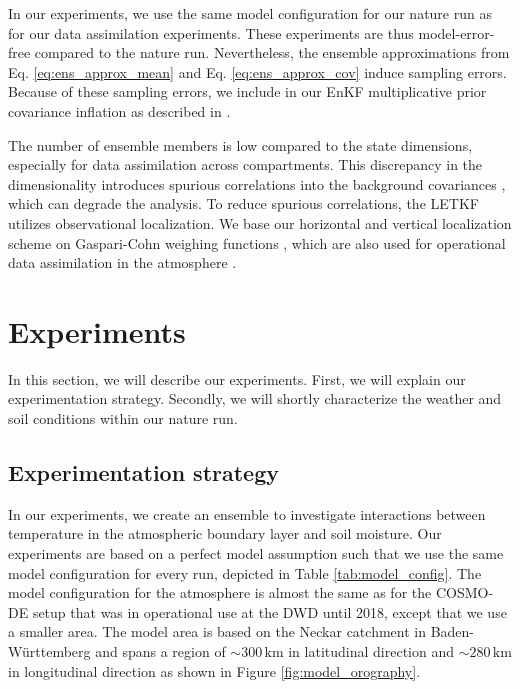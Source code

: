 \documentclass[hess, manuscript]{copernicus}
\begin{document}
In our experiments, we use the same model configuration for our nature run as for our data assimilation experiments.
These experiments are thus model-error-free compared to the nature run.
Nevertheless, the ensemble approximations from Eq. \eqref{eq:ens_approx_mean} and Eq. \eqref{eq:ens_approx_cov} induce sampling errors.
Because of these sampling errors, we include in our EnKF multiplicative prior covariance inflation as described in \citet{hunt_efficient_2007}.

The number of ensemble members is low compared to the state dimensions, especially for data assimilation across compartments.
This discrepancy in the dimensionality introduces spurious correlations into the background covariances \citep{miyoshi_10240-member_2014}, which can degrade the analysis.
To reduce spurious correlations, the LETKF utilizes observational localization.
We base our horizontal and vertical localization scheme on Gaspari-Cohn weighing functions \citep{gaspari_construction_1999}, which are also used for operational data assimilation in the atmosphere \citep{schraff_kilometre-scale_2016}.


\section{Experiments}

In this section, we will describe our experiments.
First, we will explain our experimentation strategy.
Secondly, we will shortly characterize the weather and soil conditions within our nature run.

\subsection{Experimentation strategy}

In our experiments, we create an ensemble to investigate interactions between temperature in the atmospheric boundary layer and soil moisture.
Our experiments are based on a perfect model assumption such that we use the same model configuration for every run, depicted in Table \ref{tab:model_config}.
The model configuration for the atmosphere is almost the same as for the COSMO-DE setup that was in operational use at the DWD until 2018, except that we use a smaller area.
The model area is based on the Neckar catchment in Baden-Württemberg and spans a region of $\sim 300\,\text{km}$ in latitudinal direction and $\sim 280\,\text{km}$ in longitudinal direction as shown in Figure \ref{fig:model_orography}.
\end{document}
